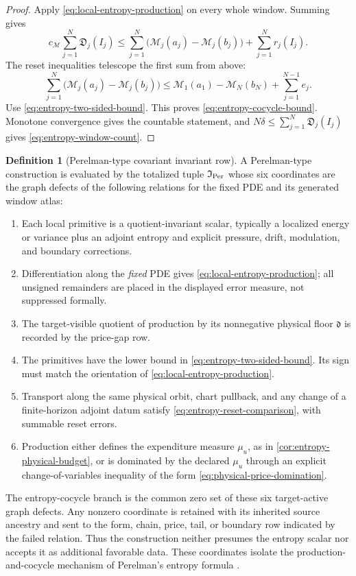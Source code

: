 \documentclass[11pt]{article}
\numberwithin{section}{part}
\theoremstyle{plain}
\theoremstyle{definition}
\newtheorem{definition}[definition]{Definition}
\theoremstyle{remark}
\newcommand{\Production}{\mathfrak D}
\newcommand{\Entropy}{\mathcal M}
\begin{document}
\begin{proof}
Apply \eqref{eq:local-entropy-production} on every whole window.  Summing
gives
\[
 c_{\Entropy}\sum_{j=1}^{N}\Production_j(I_j)
 \le
 \sum_{j=1}^{N}
   \bigl(\Entropy_j(a_j)-\Entropy_j(b_j)\bigr)
 +\sum_{j=1}^{N}r_j(I_j).
\]
The reset inequalities telescope the first sum from above:
\[
 \sum_{j=1}^{N}
   \bigl(\Entropy_j(a_j)-\Entropy_j(b_j)\bigr)
 \le
 \Entropy_1(a_1)-\Entropy_N(b_N)+\sum_{j=1}^{N-1}e_j.
\]
Use \eqref{eq:entropy-two-sided-bound}.  This proves
\eqref{eq:entropy-cocycle-bound}.  Monotone convergence gives the countable
statement, and \(N\delta\le\sum_{j=1}^{N}\Production_j(I_j)\) gives
\eqref{eq:entropy-window-count}.
\end{proof}

\begin{definition}[Perelman-type covariant invariant row]
\label{cert:perelman-compiler}
A Perelman-type construction is evaluated by the totalized tuple
\(\mathfrak I_{\rm Per}\) whose six coordinates are the graph defects of the
following relations for the fixed PDE and its generated window atlas:
\begin{enumerate}[label=\textup{(P\arabic*)}]
\item Each local primitive is a quotient-invariant scalar, typically a
  localized energy or variance plus an adjoint entropy and explicit
  pressure, drift, modulation, and boundary corrections.
\item Differentiation along the \emph{fixed} PDE gives
  \eqref{eq:local-entropy-production}; all unsigned remainders are placed in
  the displayed error measure, not suppressed formally.
\item The target-visible quotient of production by its nonnegative physical
  floor \(\mathfrak d\) is recorded by the price-gap row.
\item The primitives have the lower bound in
  \eqref{eq:entropy-two-sided-bound}.  Its sign must match the orientation
  of \eqref{eq:local-entropy-production}.
\item Transport along the same physical orbit, chart pullback, and any change
  of a finite-horizon adjoint datum satisfy
  \eqref{eq:entropy-reset-comparison}, with summable reset errors.
\item Production either defines the expenditure measure \(\mu_u\), as in
  \cref{cor:entropy-physical-budget}, or is dominated by the declared
  \(\mu_u\) through an explicit change-of-variables inequality of the form
  \eqref{eq:physical-price-domination}.
\end{enumerate}
The entropy-cocycle branch is the common zero set of these six target-active
graph defects.  Any nonzero coordinate is retained with its inherited source
ancestry and sent to the form, chain, price, tail, or boundary row indicated
by the failed relation.  Thus the construction neither presumes the entropy
scalar nor accepts it as additional favorable data.  These coordinates
isolate the production-and-cocycle mechanism of Perelman's entropy formula
\citep{Perelman2002}.
\end{definition}
\end{document}
